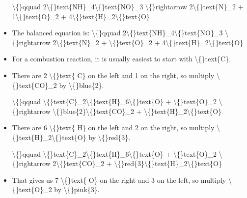 \documentclass{article}
\begin{document}
\begin{itemize}
                    \textbackslash\{\}qquad
                        2\textbackslash\{\}text\{NH\}\_4\textbackslash\{\}text\{NO\}\_3 \textbackslash\{\}rightarrow 2\textbackslash\{\}text\{N\}\_2 + 1\textbackslash\{\}text\{O\}\_2 + 4\textbackslash\{\}text\{H\}\_2\textbackslash\{\}text\{O\}
  \item The balanced equation is:
                    \textbackslash\{\}qquad
                        2\textbackslash\{\}text\{NH\}\_4\textbackslash\{\}text\{NO\}\_3 \textbackslash\{\}rightarrow 2\textbackslash\{\}text\{N\}\_2 + \textbackslash\{\}text\{O\}\_2 + 4\textbackslash\{\}text\{H\}\_2\textbackslash\{\}text\{O\}
  \item For a combustion reaction, it is usually easiest to start
                    with \textbackslash\{\}text\{C\}.
  \item There are 2 \textbackslash\{\}text\{ C\} on the left and
                        1 on the right, so multiply
                        \textbackslash\{\}text\{CO\}\_2 by \textbackslash\{\}blue\{2\}.
                    
                    \textbackslash\{\}qquad
                        \textbackslash\{\}text\{C\}\_2\textbackslash\{\}text\{H\}\_6\textbackslash\{\}text\{O\} + \textbackslash\{\}text\{O\}\_2 \textbackslash\{\}rightarrow \textbackslash\{\}blue\{2\}\textbackslash\{\}text\{CO\}\_2 + \textbackslash\{\}text\{H\}\_2\textbackslash\{\}text\{O\}
  \item There are 6 \textbackslash\{\}text\{ H\} on the left and
                        2 on the right, so multiply
                        \textbackslash\{\}text\{H\}\_2\textbackslash\{\}text\{O\} by \textbackslash\{\}red\{3\}.
                    
                    \textbackslash\{\}qquad
                        \textbackslash\{\}text\{C\}\_2\textbackslash\{\}text\{H\}\_6\textbackslash\{\}text\{O\} + \textbackslash\{\}text\{O\}\_2 \textbackslash\{\}rightarrow 2\textbackslash\{\}text\{CO\}\_2 + \textbackslash\{\}red\{3\}\textbackslash\{\}text\{H\}\_2\textbackslash\{\}text\{O\}
  \item That gives us 7 \textbackslash\{\}text\{ O\} on the right and
                        3 on the left, so multiply
                        \textbackslash\{\}text\{O\}\_2 by \textbackslash\{\}pink\{3\}.
                    

\end{itemize}
\end{document}
